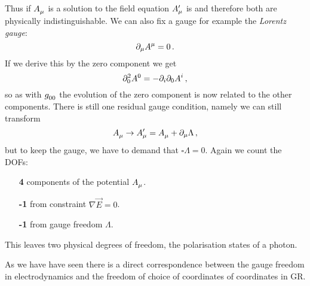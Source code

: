 Thus if $\tensor{A}{_\mu}$ is a solution to the field
equation $\tensor*{A}{*_\mu^\prime}$ is and therefore both are physically
indistinguishable. We can also fix a gauge for example the \emph{Lorentz gauge}:
\begin{equation}
\partial_\mu\tensor{A}{^\mu}=0\, .
\end{equation}
If we derive this by the zero component we get
\begin{equation}
\partial_{0}^2\tensor{A}{^0}=-\partial_i\partial_0\tensor{A}{^i}\, ,
\end{equation}
so as with $\tensor{g}{_0_0}$ the evolution of the zero component is now related
to the other components. There is still one residual gauge condition, namely we can
still transform
\begin{equation}
\tensor{A}{_\mu}\to\tensor*{A}{*_\mu^\prime}=
\tensor{A}{_\mu}+\partial_\mu\Lambda\, ,
\end{equation}
but to keep the gauge, we have to demand that $\square\Lambda=0$.
Again we count the DOFs:
\begin{itemize}
  \item[\color{section_color}\textsf{\textbf{4}}] components of the potential
  $\tensor{A}{_\mu}$.
  \item[\color{section_color}\textsf{\textbf{-1}}] from constraint
  $\nabla\vec{E}=0$.
  \item[\color{section_color}\textsf{\textbf{-1}}] from gauge freedom
  $\Lambda$.
\end{itemize}
This leaves two physical degrees of freedom, the polarisation states of a
photon.
\begin{remark}
As we have have seen there is a direct correspondence between the gauge freedom
in electrodynamics and the freedom of choice of coordinates of coordinates in
GR.
\end{remark}
